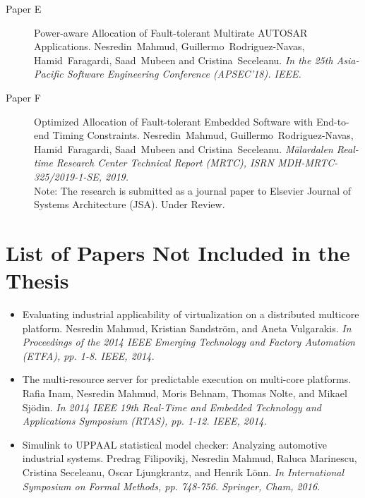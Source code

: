 {\begin{description}
     \item[Paper E] Power-aware Allocation of Fault-tolerant Multirate AUTOSAR Applications.
     Nesredin~Mahmud, Guillermo~Rodriguez-Navas, Hamid~Faragardi, Saad~Mubeen and Cristina~Seceleanu. \textit{In the 25th Asia-Pacific Software Engineering Conference (APSEC'18). IEEE.} \label{lbl_resa} \label{lbl_softwareallocation_ilp}
        \vspace{1cm}
	\item[Paper F] Optimized Allocation of Fault-tolerant Embedded Software with End-to-end Timing Constraints.	Nesredin~Mahmud, Guillermo~Rodriguez-Navas, Hamid~Faragardi, Saad~Mubeen and Cristina~Seceleanu. \textit{M\"{a}lardalen Real-time Research Center Technical Report (MRTC), ISRN MDH-MRTC-325/2019-1-SE, 2019.}\\
	{\footnotesize Note: The research is submitted as a journal paper to Elsevier Journal of Systems Architecture (JSA). Under Review}. \label{lbl_softwareallocation_pso}
    \end{description}
\section*{\Large  List of Papers Not Included in the Thesis}
\vspace{1\baselineskip}
\begin{itemize}	
	\item Evaluating industrial applicability of virtualization on a distributed multicore platform. Nesredin Mahmud, Kristian Sandstr{\"o}m, and Aneta Vulgarakis.  \textit{In Proceedings of the 2014 IEEE Emerging Technology and Factory Automation (ETFA), pp. 1-8. IEEE, 2014.}
	\item The multi-resource server for predictable execution on multi-core platforms. Rafia Inam, Nesredin Mahmud, Moris Behnam, Thomas Nolte, and Mikael Sj{\"o}din. \textit{In 2014 IEEE 19th Real-Time and Embedded Technology and Applications Symposium (RTAS), pp. 1-12. IEEE, 2014.}
	\item Simulink to UPPAAL statistical model checker: Analyzing automotive industrial systems. Predrag Filipovikj, Nesredin Mahmud, Raluca Marinescu, Cristina Seceleanu, Oscar Ljungkrantz, and Henrik L{\"o}nn. \textit{In International Symposium on Formal Methods, pp. 748-756. Springer, Cham, 2016.}
\end{itemize}

\vspace{1\baselineskip} }



